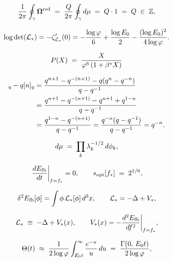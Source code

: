\begin{equation}
  \frac{1}{2\pi}\oint_\gamma \boldsymbol{\Omega}^{\mathrm{red}}
  \;=\; \frac{Q}{2\pi}\oint_\gamma d\mu
  \;=\; Q\cdot 1
  \;=\; Q \;\in\;\mathbb{Z},
  \label{P10:eq:integrality}
\end{equation}

\begin{equation}
  \log\det(\mathcal{L}_*)
  = -\zeta'_{\mathcal{L}_*}(0)
  = -\frac{\log\varphi}{6} + \frac{\log E_0}{2}
    - \frac{(\log E_0)^2}{4\log\varphi}.
  \label{P10:eq:logdet}
\end{equation}

\begin{equation}
  P(X) \;=\; \frac{X}{\varphi^6\,(1+\beta^{*} X)}
  \label{P10:eq:parent_action_wald}
\end{equation}

\begin{align}
  [n+1]_q - q[n]_q
  &= \frac{q^{n+1}-q^{-(n+1)}-q(q^n-q^{-n})}{q-q^{-1}} \notag\\
  &= \frac{q^{n+1}-q^{-(n+1)}-q^{n+1}+q^{1-n}}{q-q^{-1}} \notag\\
  &= \frac{q^{1-n}-q^{-(n+1)}}{q-q^{-1}}
   = \frac{q^{-n}(q-q^{-1})}{q-q^{-1}}
   = q^{-n}. \label{P10:eq:q_identity}
\end{align}

\begin{equation}
  d\mu \;=\; \prod_k \lambda_k^{-1/2}\,d\phi_k,
  \label{P10:eq:regularised_measure}
\end{equation}

\begin{equation}
  \left.\frac{dE_{\mathrm{fb}}}{dt}\right|_{f=f_*} = 0,
  \qquad
  s_{\mathrm{opt}}[f_*] \;=\; 2^{1/6},
  \label{P10:eq:saddle_conditions}
\end{equation}

\begin{equation}
  \delta^2E_{\mathrm{fb}}[\phi]
  = \int \phi\,\mathcal{L}_*[\phi]\,d^3x,
  \qquad
  \mathcal{L}_* = -\Delta + V_*,
  \label{P10:eq:second_var}
\end{equation}

\begin{equation}
  \mathcal{L}_*
  \;\equiv\; -\Delta + V_*(x),
  \qquad
  V_*(x) = -\frac{d^2E_{\mathrm{fb}}}{df^2}\bigg|_{f=f_*},
  \label{P10:eq:stab_op}
\end{equation}

\begin{equation}
  \Theta(t)\;\approx\;
  \frac{1}{2\log\varphi}\int_{E_0 t}^\infty\frac{e^{-u}}{u}\,du
  \;=\; \frac{\Gamma(0,\,E_0 t)}{2\log\varphi},
  \label{P10:eq:theta_gamma}
\end{equation}

